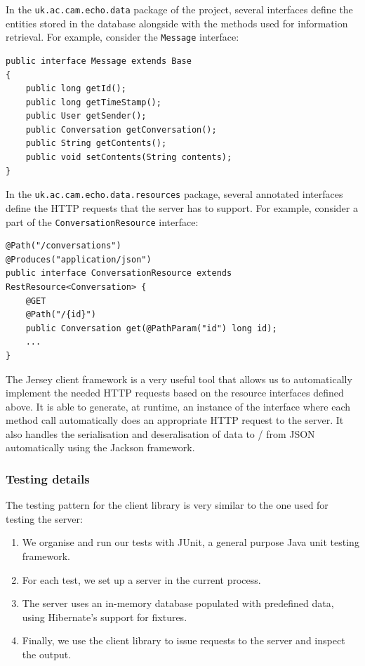 \documentclass[12p, a4paper, onecolumn]{report}
\begin{document}
In the \texttt{uk.ac.cam.echo.data} package of the project, several interfaces define the entities stored in the database alongside with the methods used for information retrieval. For example, consider the \texttt{Message} interface: 
\begin{lstlisting}
public interface Message extends Base
{
	public long getId();
	public long getTimeStamp();
	public User getSender();
	public Conversation getConversation();
	public String getContents();
	public void setContents(String contents);
}
\end{lstlisting}
In the \texttt{uk.ac.cam.echo.data.resources} package, several annotated interfaces define the HTTP requests that the server has to support. For example, consider a part of the \texttt{ConversationResource} interface:
\begin{lstlisting}
@Path("/conversations")
@Produces("application/json")
public interface ConversationResource extends RestResource<Conversation> {
    @GET
    @Path("/{id}")
    public Conversation get(@PathParam("id") long id);
    ...
}
\end{lstlisting}
The Jersey client framework is a very useful tool that allows us to automatically implement the needed HTTP requests based on the resource interfaces defined above. It is able to generate, at runtime, an instance of the interface where each method call automatically does an appropriate HTTP request to the server. It also handles the serialisation and deseralisation of data to / from JSON automatically using the Jackson framework.

\subsubsection{Testing details}

The testing pattern for the client library is very similar to the one used for testing the server:
\begin{enumerate}
\item We organise and run our tests with JUnit, a general purpose Java unit testing framework. 
\item For each test, we set up a server in the current process.
\item The server uses an in-memory database populated with predefined data, using Hibernate’s support for fixtures.
\item Finally, we use the client library to issue requests to the server and inspect the output.
\end{enumerate}
\end{document}
